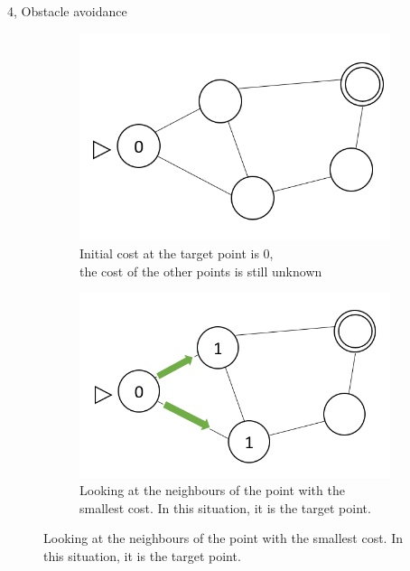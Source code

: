 \documentclass[10pt,a4paper]{article}
\begin{document}
\begin{task}{4, Obstacle avoidance}
\begin{figure}[H]
\begin{subfigure}{0.5\textwidth}
 \centering
 \includegraphics[width=1\textwidth]{images/task4_dij_mod_0.png}
 \caption{Initial cost at the target point is 0, \\ the cost of the other points is still unknown}
 
 \end{subfigure}
\begin{subfigure}{0.5\textwidth}
 \centering
 \includegraphics[width=1\textwidth]{images/task4_dij_mod_1.png}
 \caption{Looking at the neighbours of the point with the smallest cost. In this situation, it is the target point. } 
 \end{subfigure}

 
   \begin{center}
       


\end{center}
\end{figure}
\end{task}
\end{document}
